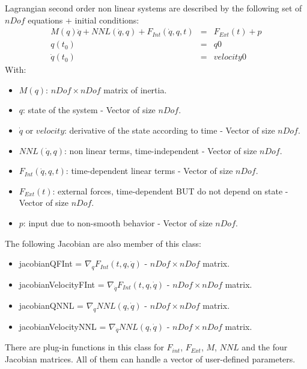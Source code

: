 \documentclass[10pt]{report}
\begin{document}
Lagrangian second order non linear systems are described by the following set of$nDof$ equations + initial conditions:
\begin{eqnarray}
 M(q) \ddot q + NNL(\dot q, q) + F_{Int}(\dot q , q , t) &=& F_{Ext}(t) + p \\
 q(t_0) &=& q0 \\
 \dot q(t_0) &=& velocity0
\end{eqnarray}
With:
\begin{itemize}
\item $M(q)$: $nDof\times nDof$ matrix of inertia.
\item $q$: state of the system - Vector of size $nDof$.
\item $\dot q$ or $velocity$: derivative of the state according to time - Vector of size $nDof$.
\item $NNL(\dot q, q)$:  non linear terms, time-independent - Vector of size $nDof$.
\item $F_{Int}(\dot q , q , t)$: time-dependent linear terms - Vector of size $nDof$.
\item $F_{Ext}(t)$: external forces, time-dependent BUT do not depend on state - Vector of size $nDof$.
\item $p$: input due to non-smooth behavior - Vector of size $nDof$.
\end{itemize}

The following Jacobian are also member of this class:
\begin{itemize}
\item jacobianQFInt = $\nabla_q F_{Int}(t,q,\dot q)$ - $nDof\times nDof$ matrix.
\item jacobianVelocityFInt = $\nabla_{\dot q} F_{Int}(t,q,\dot q)$ - $nDof\times nDof$ matrix.
\item jacobianQNNL = $\nabla_q NNL(q,\dot q)$ - $nDof\times nDof$ matrix.
\item jacobianVelocityNNL = $\nabla_{\dot q}NNL(q,\dot q)$ - $nDof\times nDof$ matrix.
\end{itemize}


There are plug-in functions in this class for $F_{int}$, $F_{Ext}$, $M$, $NNL$ and the four Jacobian matrices. All
of them can handle a vector of user-defined parameters. \\
\end{document}

